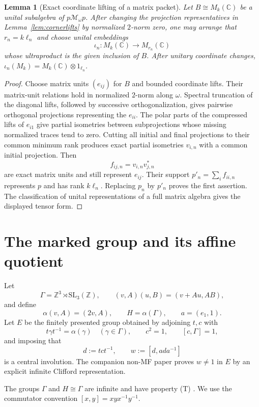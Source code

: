 \documentclass[11pt]{article}
\newtheorem{lemma}[theorem]{Lemma}
\theoremstyle{definition}
\theoremstyle{remark}
\newcommand{\Z}{\mathbb Z}
\newcommand{\C}{\mathbb C}
\begin{document}
\begin{lemma}[Exact coordinate lifting of a matrix packet]
\label{lem:matrixlift}
Let $B\cong M_k(\C)$ be a unital subalgebra of
$p\mathcal M_\omega p$.  After changing the projection representatives in
Lemma~\ref{lem:cornerlifts} by normalized $2$-norm zero, one may arrange
that $r_n=k\ell_n$ and choose unital embeddings
\[
 \iota_n:M_k(\C)\longrightarrow M_{r_n}(\C)
\]
whose ultraproduct is the given inclusion of $B$.  After unitary coordinate
changes, $\iota_n(M_k)=M_k(\C)\otimes1_{\ell_n}$.
\end{lemma}

\begin{proof}
Choose matrix units $(e_{ij})$ for $B$ and bounded coordinate lifts.  Their
matrix-unit relations hold in normalized $2$-norm along $\omega$.
Spectral truncation of the diagonal lifts, followed by successive
orthogonalization, gives pairwise orthogonal projections representing the
$e_{ii}$.  The polar parts of the compressed lifts of $e_{i1}$ give partial
isometries between subprojections whose missing normalized traces tend to
zero.  Cutting all initial and final projections to their common minimum
rank produces exact partial isometries $v_{i,n}$ with a common initial
projection.  Then
\[
 f_{ij,n}=v_{i,n}v_{j,n}^*
\]
are exact matrix units and still represent $e_{ij}$.  Their support
$p'_n=\sum_i f_{ii,n}$ represents $p$ and has rank $k\ell_n$.  Replacing
$p_n$ by $p'_n$ proves the first assertion.  The classification of unital
representations of a full matrix algebra gives the displayed tensor form.
\end{proof}

\section{The marked group and its affine quotient}

Let
\[
 \Gamma=\Z^3\rtimes \mathrm{SL}_3(\Z),
 \qquad (v,A)(u,B)=(v+Au,AB),
\]
and define
\[
 \alpha(v,A)=(2v,A),\qquad H=\alpha(\Gamma),
 \qquad a=(e_1,1).
\]
Let $E$ be the finitely presented group obtained by adjoining $t,c$ with
\[
 t\gamma t^{-1}=\alpha(\gamma)\quad(\gamma\in\Gamma),
 \qquad c^2=1,\qquad[c,\Gamma]=1,
\]
and imposing that
\[
 d:=tct^{-1},\qquad w:=[d,ada^{-1}]
\]
is a central involution.  The companion non-MF paper proves $w\ne1$ in
$E$ by an explicit infinite Clifford representation.

The groups $\Gamma$ and $H\cong\Gamma$ are infinite and have property
\textup{(T)} \cite[Example~1.7.4(i)]{BHV}.  We use the commutator convention
$[x,y]=xyx^{-1}y^{-1}$.
\end{document}
